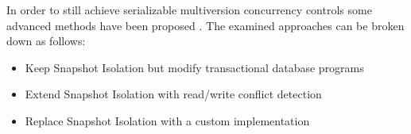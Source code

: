 In order to still achieve serializable multiversion concurrency controls some
advanced methods have been proposed \cite{fekete2005making,
cahill2009serializable, neumann2015fast}. The examined approaches can be broken
down as follows:

\begin{itemize}
    \item Keep Snapshot Isolation but modify transactional database programs
    \item Extend Snapshot Isolation with read/write conflict detection
    \item Replace Snapshot Isolation with a custom implementation
\end{itemize}
